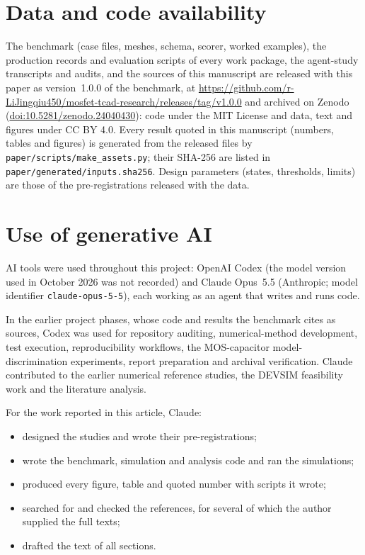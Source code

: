 \documentclass[11pt]{article}
\begin{document}
\section*{Data and code availability}
The benchmark (case files, meshes, schema, scorer, worked examples), the production records and evaluation scripts of
every work package, the agent-study transcripts and audits, and the sources of this manuscript are released with this
paper as version~1.0.0 of the benchmark, at \url{https://github.com/r-LiJingqiu450/mosfet-tcad-research/releases/tag/v1.0.0}
and archived on Zenodo (\href{https://doi.org/10.5281/zenodo.24040430}{doi:10.5281/zenodo.24040430}): code under the MIT License and data, text and figures under CC BY 4.0. Every result quoted in this manuscript (numbers, tables and figures) is
generated from the released files by \texttt{paper/scripts/make\_assets.py}; their SHA-256 are listed in \texttt{paper/generated/inputs.sha256}.
Design parameters (states, thresholds, limits) are those of the pre-registrations released with the data.

\section*{Use of generative AI}
AI tools were used throughout this project: OpenAI Codex (the model version used in October 2026 was not recorded) and
Claude Opus~5.5 (Anthropic; model identifier \texttt{claude-opus-5-5}), each working as an agent that writes and runs code.

In the earlier project phases, whose code and results the benchmark cites as sources, Codex was used for repository
auditing, numerical-method development, test execution, reproducibility workflows, the MOS-capacitor model-discrimination
experiments, report preparation and archival verification. Claude contributed to the earlier numerical reference studies,
the DEVSIM feasibility work and the literature analysis.

For the work reported in this article, Claude:
\begin{itemize}
\item designed the studies and wrote their pre-registrations;
\item wrote the benchmark, simulation and analysis code and ran the simulations;
\item produced every figure, table and quoted number with scripts it wrote;
\item searched for and checked the references, for several of which the author supplied the full texts;
\item drafted the text of all sections.
\end{itemize}
\end{document}
